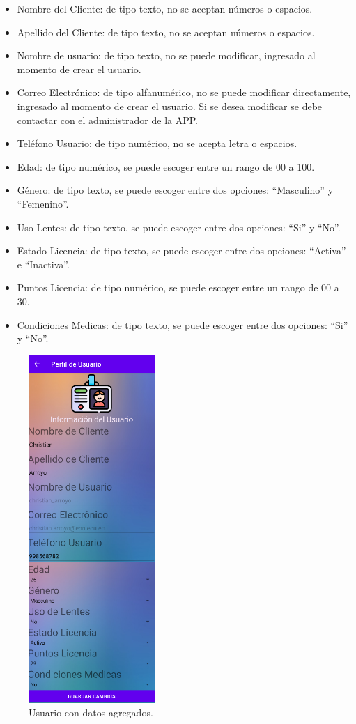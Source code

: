 \documentclass[a4paper,10pt, oneside, titlepage]{article}
\begin{document}
	\begin{itemize}
		\item Nombre del Cliente: de tipo texto, no se aceptan números o espacios.
		\item Apellido del Cliente: de tipo texto, no se aceptan números o espacios.
		\item Nombre de usuario: de tipo texto, no se puede modificar, ingresado al momento de crear el usuario.
		\item Correo Electrónico: de tipo alfanumérico, no se puede modificar directamente, ingresado al momento de crear el usuario. Si se desea modificar se debe contactar con el administrador de la APP.
		\item Teléfono Usuario: de tipo numérico, no se acepta letra o espacios.
		\item Edad: de tipo numérico, se puede escoger entre un rango de 00 a 100.
		\item Género: de tipo texto, se puede escoger entre dos opciones: ``Masculino'' y ``Femenino''.
		\item Uso Lentes: de tipo texto, se puede escoger entre dos opciones: ``Si'' y ``No''.
		\item Estado Licencia: de tipo texto, se puede escoger entre dos opciones: ``Activa'' e ``Inactiva''.
		\item Puntos Licencia: de tipo numérico, se puede escoger entre un rango de 00 a 30.
		\item Condiciones Medicas: de tipo texto, se puede escoger entre dos opciones: ``Si'' y ``No''.
	\end{itemize}
	\begin{figure}[!ht]
		\centering
		\includegraphics[width = 0.4\linewidth, height = 13.2cm]{40.png}
		\caption{Usuario con datos agregados.}
	\end{figure}
\end{document}
